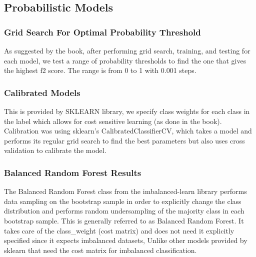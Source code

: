 \documentclass{article}
\begin{document}
\subsection{Probabilistic Models}
\subsubsection{Grid Search For Optimal Probability Threshold}
As suggested by the book, after performing grid search, training, and testing for each model, we test a range of probability thresholds to find the one that gives the highest f2 score. The range is from 0 to 1 with 0.001 steps.

\subsubsection{Calibrated Models}
This is provided by SKLEARN library, we specify class weights for each class in the label which allows for cost sensitive learning (as done in the book). Calibration was using sklearn's CalibratedClassifierCV, which takes a model and performs its regular grid search to find the best parameters but also uses cross validation to calibrate the model.

\subsubsection{Balanced Random Forest Results}
The Balanced Random Forest class from the imbalanced-learn library performs data sampling on the bootstrap sample
in order to explicitly change the class distribution and performs random undersampling of the majority class in each bootstrap sample. This is generally referred to as Balanced Random
Forest. It takes care of the class\_weight (cost matrix) and does not need it explicitly specified since it expects imbalanced datasets, Unlike other models provided by sklearn that need the cost matrix for imbalanced classification.
\end{document}
